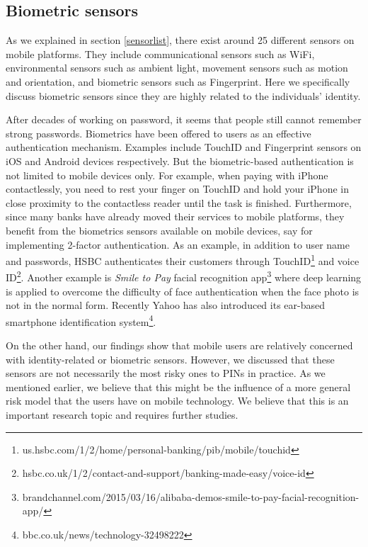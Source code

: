 \documentclass[10pt,twocolumn]{article}
\begin{document}
\subsection{Biometric sensors}
As we explained in section \ref{sensorlist}, there exist around 25 different sensors on mobile platforms. They include communicational  sensors such as WiFi, environmental sensors such as ambient light, movement sensors such as motion and orientation, and biometric sensors such as Fingerprint. Here we specifically discuss biometric sensors since they are highly related to the individuals' identity. 

After decades of working on password, it seems that people still cannot remember strong passwords. 
Biometrics have been offered to users as an effective authentication mechanism. Examples include TouchID and Fingerprint sensors on iOS and Android devices respectively. But the biometric-based authentication is not limited to mobile devices only. For example, when paying with iPhone contactlessly, you need to rest your finger on TouchID and hold your iPhone in close proximity to the contactless reader until the task is finished. Furthermore, since many banks have already moved their services to mobile platforms, they benefit from the biometrics sensors available on mobile devices, say for implementing 2-factor authentication. As an example, in addition to user name and passwords, HSBC authenticates their customers through TouchID\footnote{us.hsbc.com/1/2/home/personal-banking/pib/mobile/touchid} and voice ID\footnote{hsbc.co.uk/1/2/contact-and-support/banking-made-easy/voice-id}. Another example is \textit{Smile to Pay} facial recognition app\footnote{brandchannel.com/2015/03/16/alibaba-demos-smile-to-pay-facial-recognition-app/} where deep learning is applied to overcome the difficulty of face authentication when the face photo is not in the normal form. Recently Yahoo has also introduced its ear-based smartphone identification system\footnote{bbc.co.uk/news/technology-32498222}.

On the other hand, our findings show that mobile users are relatively concerned with identity-related or biometric sensors. However, we discussed that these sensors are not necessarily the most risky ones to PINs in practice. As we mentioned earlier, we believe that this might be the influence of a more general risk model that the users have on mobile technology. We believe that this is an important research topic and requires further studies. 
\end{document}

